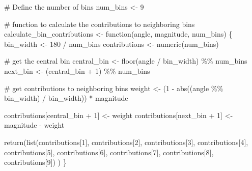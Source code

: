 \documentclass[
  letterpaper,
]{report}
\newenvironment{Shaded}{\begin{snugshade}}{\end{snugshade}}
\newcommand{\CommentTok}[1]{\textcolor[rgb]{0.37,0.37,0.37}{#1}}
\newcommand{\ControlFlowTok}[1]{\textcolor[rgb]{0.00,0.23,0.31}{#1}}
\newcommand{\DecValTok}[1]{\textcolor[rgb]{0.68,0.00,0.00}{#1}}
\newcommand{\FunctionTok}[1]{\textcolor[rgb]{0.28,0.35,0.67}{#1}}
\newcommand{\NormalTok}[1]{\textcolor[rgb]{0.00,0.23,0.31}{#1}}
\newcommand{\OtherTok}[1]{\textcolor[rgb]{0.00,0.23,0.31}{#1}}
\newcommand{\SpecialCharTok}[1]{\textcolor[rgb]{0.37,0.37,0.37}{#1}}
\begin{document}
\begin{Shaded}
\begin{Highlighting}[]
\CommentTok{\# Define the number of bins}
\NormalTok{num\_bins }\OtherTok{\textless{}{-}} \DecValTok{9}

\CommentTok{\# function to calculate the contributions to neighboring bins}
\NormalTok{calculate\_bin\_contributions }\OtherTok{\textless{}{-}} \ControlFlowTok{function}\NormalTok{(angle, magnitude, num\_bins) \{}
\NormalTok{  bin\_width }\OtherTok{\textless{}{-}} \DecValTok{180} \SpecialCharTok{/}\NormalTok{ num\_bins}
\NormalTok{  contributions }\OtherTok{\textless{}{-}} \FunctionTok{numeric}\NormalTok{(num\_bins)}
  
  \CommentTok{\# get the central bin}
\NormalTok{  central\_bin }\OtherTok{\textless{}{-}} \FunctionTok{floor}\NormalTok{(angle }\SpecialCharTok{/}\NormalTok{ bin\_width) }\SpecialCharTok{\%\%}\NormalTok{ num\_bins}
\NormalTok{  next\_bin }\OtherTok{\textless{}{-}}\NormalTok{ (central\_bin }\SpecialCharTok{+} \DecValTok{1}\NormalTok{) }\SpecialCharTok{\%\%}\NormalTok{ num\_bins}
  
  \CommentTok{\# get contributions to neighboring bins}
\NormalTok{  weight }\OtherTok{\textless{}{-}}\NormalTok{ (}\DecValTok{1} \SpecialCharTok{{-}} \FunctionTok{abs}\NormalTok{((angle }\SpecialCharTok{\%\%}\NormalTok{ bin\_width) }\SpecialCharTok{/}\NormalTok{ bin\_width)) }\SpecialCharTok{*}\NormalTok{ magnitude}
  
\NormalTok{  contributions[central\_bin }\SpecialCharTok{+} \DecValTok{1}\NormalTok{] }\OtherTok{\textless{}{-}}\NormalTok{ weight}
\NormalTok{  contributions[next\_bin }\SpecialCharTok{+} \DecValTok{1}\NormalTok{] }\OtherTok{\textless{}{-}}\NormalTok{ magnitude }\SpecialCharTok{{-}}\NormalTok{ weight}
  
  \FunctionTok{return}\NormalTok{(}\FunctionTok{list}\NormalTok{(contributions[}\DecValTok{1}\NormalTok{],}
\NormalTok{         contributions[}\DecValTok{2}\NormalTok{],}
\NormalTok{         contributions[}\DecValTok{3}\NormalTok{],}
\NormalTok{         contributions[}\DecValTok{4}\NormalTok{],}
\NormalTok{         contributions[}\DecValTok{5}\NormalTok{],}
\NormalTok{         contributions[}\DecValTok{6}\NormalTok{],}
\NormalTok{         contributions[}\DecValTok{7}\NormalTok{],}
\NormalTok{         contributions[}\DecValTok{8}\NormalTok{],}
\NormalTok{         contributions[}\DecValTok{9}\NormalTok{])}
\NormalTok{         )}
\NormalTok{\}}


\end{Highlighting}
\end{Shaded}
\end{document}
